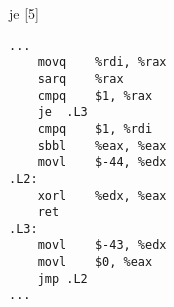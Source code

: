 \begin{figure}[H]
\begin{subfigure}[T]{0.30333333333333334\textwidth}
\begin{lrbox}{\mybox}
%
        \end{lrbox}\resizebox{\textwidth}{!}{\usebox{\mybox}}
\end{subfigure}
\begin{subfigure}[T]{0.30333333333333334\textwidth}
\caption*{}
\end{subfigure}
\begin{subfigure}[T]{0.30333333333333334\textwidth}
\caption*{}
\end{subfigure}
\hspace*{6mm}
\begin{subfigure}[T]{0.2733333333333333\textwidth}
\vspace*{2mm}\tiny je [5]
\begin{lstlisting}[style=defstyle,language={[x86masm]Assembler},basicstyle=\tiny\ttfamily,breaklines=true]
...
	movq	%rdi, %rax
	sarq	%rax
	cmpq	$1, %rax
	je	.L3
	cmpq	$1, %rdi
	sbbl	%eax, %eax
	movl	$-44, %edx
.L2:
	xorl	%edx, %eax
	ret
.L3:
	movl	$-43, %edx
	movl	$0, %eax
	jmp	.L2
...\end{lstlisting}
\end{subfigure}
\end{figure}
\newpage\noindent